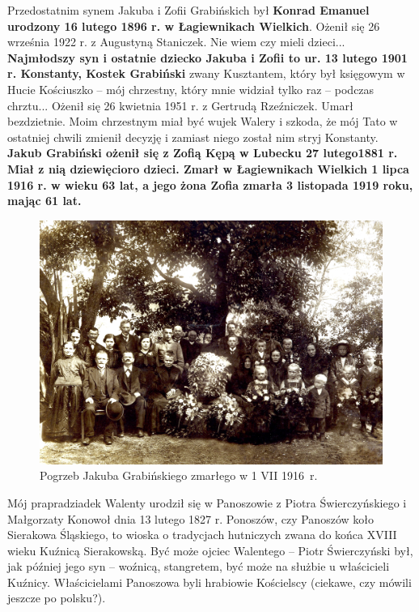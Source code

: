 Przedostatnim synem Jakuba i Zofii Grabińskich był \textbf{Konrad Emanuel urodzony 16 lutego 1896 r. w Łagiewnikach Wielkich}. Ożenił się 26 września 1922 r. z Augustyną Staniczek. Nie wiem czy mieli dzieci... \textbf{Najmłodszy syn i ostatnie dziecko Jakuba i Zofii to ur. 13 lutego 1901 r. Konstanty, Kostek Grabiński} zwany Kusztantem, który był księgowym w Hucie Kościuszko – mój chrzestny, który mnie widział tylko raz – podczas chrztu... Ożenił się 26 kwietnia 1951 r. z Gertrudą Rzeźniczek. Umarł bezdzietnie. Moim chrzestnym miał być wujek Walery i szkoda, że mój Tato w ostatniej chwili zmienił decyzję i zamiast niego został nim stryj Konstanty. \textbf{Jakub Grabiński ożenił się z Zofią Kępą w Lubecku 27 lutego1881 r. Miał z nią dziewięcioro dzieci. Zmarł w Łagiewnikach Wielkich  1 lipca 1916 r. w wieku 63 lat, a jego żona Zofia zmarła 3 listopada 1919 roku, mając 61 lat.}
\begin{figure}[!h]
\begin{center}
\includegraphics[width=\textwidth]{photo/jakub_grabinski_pogrzeb.jpg}
\caption[Pogrzeb Jakuba Grabińskiego]{Pogrzeb Jakuba Grabińskiego zmarłego w 1 VII 1916~r.}
\end{center}
\end{figure}

Mój prapradziadek Walenty urodził się w Panoszowie z Piotra Świerczyńskiego i Małgorzaty Konowoł dnia 13 lutego 1827 r. Ponoszów, czy Panoszów koło Sierakowa Śląskiego, to wioska o tradycjach hutniczych zwana do końca XVIII wieku Kuźnicą Sierakowską. Być może ojciec Walentego – Piotr Świerczyński był, jak później jego syn – woźnicą, stangretem, być może na służbie u właścicieli Kuźnicy. Właścicielami Panoszowa byli hrabiowie Kościelscy (ciekawe, czy mówili jeszcze po polsku?).

